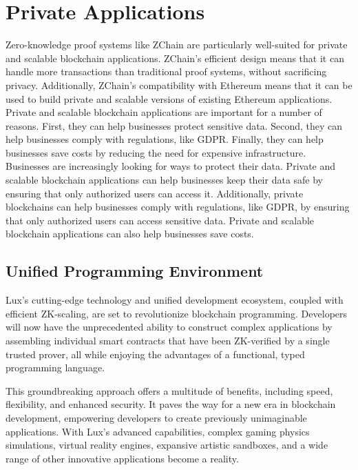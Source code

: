 \documentclass[11pt]{article}
\begin{document}
\section{Private Applications}

Zero-knowledge proof systems like ZChain are particularly well-suited for private and scalable blockchain applications. ZChain's efficient design means that it can handle more transactions than traditional proof systems, without sacrificing privacy. Additionally, ZChain's compatibility with Ethereum means that it can be used to build private and scalable versions of existing Ethereum applications. Private and scalable blockchain applications are important for a number of reasons. First, they can help businesses protect sensitive data. Second, they can help businesses comply with regulations, like GDPR. Finally, they can help businesses save costs by reducing the need for expensive infrastructure. Businesses are increasingly looking for ways to protect their data. Private and scalable blockchain applications can help businesses keep their data safe by ensuring that only authorized users can access it. Additionally, private blockchains can help businesses comply with regulations, like GDPR, by ensuring that only authorized users can access sensitive data. Private and scalable blockchain applications can also help businesses save costs.


\subsection{Unified Programming Environment}

Lux's cutting-edge technology and unified development ecosystem, coupled with efficient ZK-scaling, are set to revolutionize blockchain programming. Developers will now have the unprecedented ability to construct complex applications by assembling individual smart contracts that have been ZK-verified by a single trusted prover, all while enjoying the advantages of a functional, typed programming language.


This groundbreaking approach offers a multitude of benefits, including speed, flexibility, and enhanced security. It paves the way for a new era in blockchain development, empowering developers to create previously unimaginable applications. With Lux's advanced capabilities, complex gaming physics simulations, virtual reality engines, expansive artistic sandboxes, and a wide range of other innovative applications become a reality.
\end{document}
